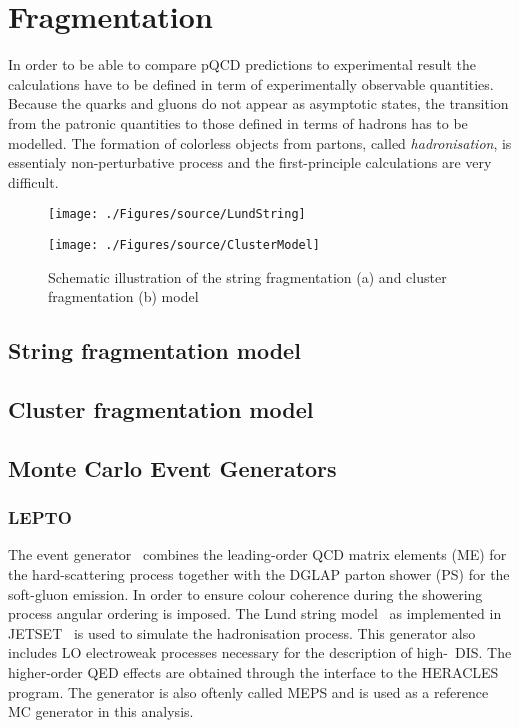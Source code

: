 \section{Fragmentation }
In order to be able to compare pQCD predictions to experimental result the calculations have to be defined in term of experimentally observable quantities. Because the quarks and gluons do not appear as asymptotic states, the transition from the patronic quantities to those defined in terms of hadrons has to be modelled. The formation of colorless objects from partons, called \emph{hadronisation}, is essentialy non-perturbative process and the first-principle calculations are very difficult. 
\begin{figure}[t]
	\centering
	\begin{subfloat}[]{
		\texttt{[image: ./Figures/source/LundString]}
		\label{fig:lund}
	 }%
	\end{subfloat}
	\begin{subfloat}[]{
		\texttt{[image: ./Figures/source/ClusterModel]}
		\label{fig:cluster}
	}%
	\end{subfloat}
	\caption{Schematic illustration of the string fragmentation (a) and cluster fragmentation (b) model}
\label{fig:fragmentationmodels}
\end{figure}
\subsection{String fragmentation model}
\subsection{Cluster fragmentation model}
\subsection{Monte Carlo Event Generators}
\subsubsection{LEPTO}
The \lepto event generator~\cite{lepto} combines the leading-order QCD matrix elements (ME) for the hard-scattering process together with the DGLAP parton shower (PS) for the soft-gluon emission. In order to ensure colour coherence during the showering process angular ordering is imposed. The Lund string model~\cite{lund} as implemented in JETSET~\cite{jetset} is used to simulate the hadronisation process. This generator also includes LO electroweak processes necessary for the description of high-\qsq~DIS. The higher-order QED effects are obtained through the interface to the HERACLES~\cite{heracles} program. The \lepto generator is also oftenly called MEPS and is used as a reference MC generator in this analysis.
